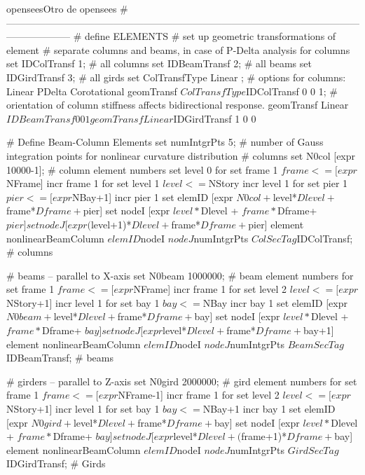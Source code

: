 \begin{sourcecode}[]{opensees}{Otro de opensees}
# --------------------------------------------------------------------------------------------------------------------------------
# define ELEMENTS
# set up geometric transformations of element
#   separate columns and beams, in case of P-Delta analysis for columns
set IDColTransf 1; # all columns
set IDBeamTransf 2; # all beams
set IDGirdTransf 3; # all girds
set ColTransfType Linear ;		# options for columns: Linear PDelta  Corotational 
geomTransf $ColTransfType  $IDColTransf  0 0 1;			# orientation of column stiffness affects bidirectional response.
geomTransf Linear $IDBeamTransf 0 0 1
geomTransf Linear $IDGirdTransf 1 0 0

# Define Beam-Column Elements
set numIntgrPts 5;	# number of Gauss integration points for nonlinear curvature distribution
# columns
set N0col [expr 10000-1];	# column element numbers
set level 0
for {set frame 1} {$frame <=[expr $NFrame]} {incr frame 1} {
	for {set level 1} {$level <=$NStory} {incr level 1} {
		for {set pier 1} {$pier <= [expr $NBay+1]} {incr pier 1} {
			set elemID [expr $N0col  +$level*$Dlevel + $frame*$Dframe+$pier]
			set nodeI [expr  $level*$Dlevel + $frame*$Dframe+$pier]
			set nodeJ  [expr  ($level+1)*$Dlevel + $frame*$Dframe+$pier]
			element nonlinearBeamColumn $elemID $nodeI $nodeJ $numIntgrPts $ColSecTag $IDColTransf;		# columns
		}
	}
}


# beams -- parallel to X-axis
set N0beam 1000000;	# beam element numbers
for {set frame 1} {$frame <=[expr $NFrame]} {incr frame 1} {
	for {set level 2} {$level <=[expr $NStory+1]} {incr level 1} {
		for {set bay 1} {$bay <= $NBay} {incr bay 1} {
			set elemID [expr $N0beam +$level*$Dlevel + $frame*$Dframe+ $bay]
			set nodeI [expr $level*$Dlevel + $frame*$Dframe+ $bay]
			set nodeJ  [expr $level*$Dlevel + $frame*$Dframe+ $bay+1]
			element nonlinearBeamColumn $elemID $nodeI $nodeJ $numIntgrPts $BeamSecTag $IDBeamTransf;	# beams
		}
	}
}

# girders -- parallel to Z-axis
set N0gird 2000000;	# gird element numbers
for {set frame 1} {$frame <=[expr $NFrame-1]} {incr frame 1} {
	for {set level 2} {$level <=[expr $NStory+1]} {incr level 1} {
		for {set bay 1} {$bay <= $NBay+1} {incr bay 1} {
			set elemID [expr $N0gird + $level*$Dlevel +$frame*$Dframe+ $bay]
			set nodeI [expr   $level*$Dlevel + $frame*$Dframe+ $bay]
			set nodeJ  [expr  $level*$Dlevel + ($frame+1)*$Dframe+ $bay]
			element nonlinearBeamColumn $elemID $nodeI $nodeJ $numIntgrPts $GirdSecTag $IDGirdTransf;		# Girds
		}
	}
}


\end{sourcecode}
